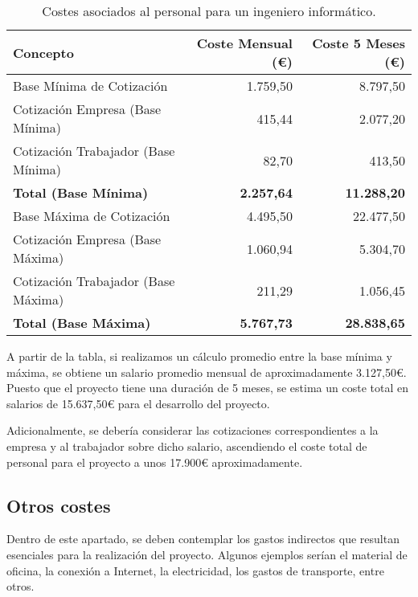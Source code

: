 \begin{table}[H]
    \centering
    \small %
    \setlength{\tabcolsep}{1.8pt} %
    \begin{tabular}{@{}lrr@{}}
        \toprule
        \textbf{Concepto} & \textbf{Coste Mensual (€)} & \textbf{Coste 5 Meses (€)} \\
        \midrule
        Base Mínima de Cotización & 1.759,50 & 8.797,50 \\
        Cotización Empresa (Base Mínima) & 415,44 & 2.077,20 \\
        Cotización Trabajador (Base Mínima) & 82,70 & 413,50 \\
        \textbf{Total (Base Mínima)} & \textbf{2.257,64} & \textbf{11.288,20} \\
        \midrule
        Base Máxima de Cotización & 4.495,50 & 22.477,50 \\
        Cotización Empresa (Base Máxima) & 1.060,94 & 5.304,70 \\
        Cotización Trabajador (Base Máxima) & 211,29 & 1.056,45 \\
        \textbf{Total (Base Máxima)} & \textbf{5.767,73} & \textbf{28.838,65} \\
        \bottomrule
    \end{tabular}

    \caption{Costes asociados al personal para un ingeniero informático.}
    \label{tab:coste-personal}

\end{table}

A partir de la tabla, si realizamos un cálculo promedio entre la base mínima y máxima, se obtiene un salario promedio mensual de aproximadamente 3.127,50€. Puesto que el proyecto tiene una duración de 5 meses, se estima un coste total en salarios de 15.637,50€ para el desarrollo del proyecto.

Adicionalmente, se debería considerar las cotizaciones correspondientes a la empresa y al trabajador sobre dicho salario, ascendiendo el coste total de personal para el proyecto a unos 17.900€ aproximadamente. 

\subsection{Otros costes}

Dentro de este apartado, se deben contemplar los gastos indirectos que resultan esenciales para la realización del proyecto. Algunos ejemplos serían el material de oficina, la conexión a Internet, la electricidad, los gastos de transporte, entre otros.

